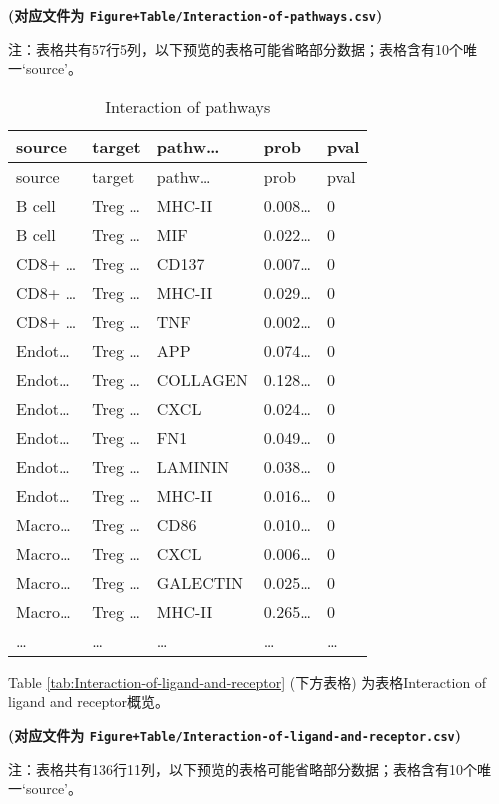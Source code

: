 \documentclass[
]{article}
\begin{document}
\textbf{(对应文件为 \texttt{Figure+Table/Interaction-of-pathways.csv})}

\begin{center}\begin{tcolorbox}[colback=gray!10, colframe=gray!50, width=0.9\linewidth, arc=1mm, boxrule=0.5pt]注：表格共有57行5列，以下预览的表格可能省略部分数据；表格含有10个唯一`source'。
\end{tcolorbox}
\end{center}

\begin{longtable}[]{@{}lllll@{}}
\caption{\label{tab:Interaction-of-pathways}Interaction of pathways}\tabularnewline
\toprule
source & target & pathw\ldots{} & prob & pval\tabularnewline
\midrule
\endfirsthead
\toprule
source & target & pathw\ldots{} & prob & pval\tabularnewline
\midrule
\endhead
B cell & Treg \ldots{} & MHC-II & 0.008\ldots{} & 0\tabularnewline
B cell & Treg \ldots{} & MIF & 0.022\ldots{} & 0\tabularnewline
CD8+ \ldots{} & Treg \ldots{} & CD137 & 0.007\ldots{} & 0\tabularnewline
CD8+ \ldots{} & Treg \ldots{} & MHC-II & 0.029\ldots{} & 0\tabularnewline
CD8+ \ldots{} & Treg \ldots{} & TNF & 0.002\ldots{} & 0\tabularnewline
Endot\ldots{} & Treg \ldots{} & APP & 0.074\ldots{} & 0\tabularnewline
Endot\ldots{} & Treg \ldots{} & COLLAGEN & 0.128\ldots{} & 0\tabularnewline
Endot\ldots{} & Treg \ldots{} & CXCL & 0.024\ldots{} & 0\tabularnewline
Endot\ldots{} & Treg \ldots{} & FN1 & 0.049\ldots{} & 0\tabularnewline
Endot\ldots{} & Treg \ldots{} & LAMININ & 0.038\ldots{} & 0\tabularnewline
Endot\ldots{} & Treg \ldots{} & MHC-II & 0.016\ldots{} & 0\tabularnewline
Macro\ldots{} & Treg \ldots{} & CD86 & 0.010\ldots{} & 0\tabularnewline
Macro\ldots{} & Treg \ldots{} & CXCL & 0.006\ldots{} & 0\tabularnewline
Macro\ldots{} & Treg \ldots{} & GALECTIN & 0.025\ldots{} & 0\tabularnewline
Macro\ldots{} & Treg \ldots{} & MHC-II & 0.265\ldots{} & 0\tabularnewline
\ldots{} & \ldots{} & \ldots{} & \ldots{} & \ldots{}\tabularnewline
\bottomrule
\end{longtable}

Table \ref{tab:Interaction-of-ligand-and-receptor} (下方表格) 为表格Interaction of ligand and receptor概览。

\textbf{(对应文件为 \texttt{Figure+Table/Interaction-of-ligand-and-receptor.csv})}

\begin{center}\begin{tcolorbox}[colback=gray!10, colframe=gray!50, width=0.9\linewidth, arc=1mm, boxrule=0.5pt]注：表格共有136行11列，以下预览的表格可能省略部分数据；表格含有10个唯一`source'。
\end{tcolorbox}
\end{center}
\end{document}
